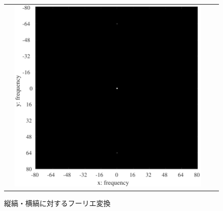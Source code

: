 \begin{figure}[H]
\begin{tabularx}{\textwidth}{p{}CCC}
\begin{minipage}{.25\textwidth}
        \end{minipage} &
        \begin{minipage}{.25\textwidth}
            \centering
            \includegraphics[keepaspectratio,width=.9\textwidth]{../../Figures/08_26_img64-fft.pdf}
        \end{minipage}                                                             \\
    \end{tabularx}
    \caption{縦縞・横縞に対するフーリエ変換}
\end{figure}
